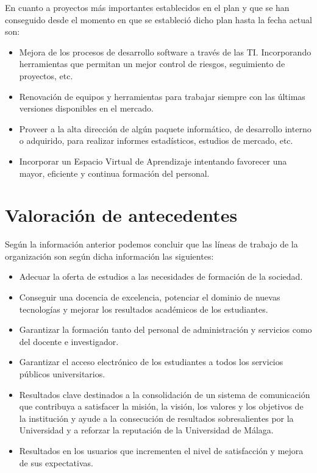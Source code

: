 \documentclass[12pt,a4paper,spanish,twoside]{book}
\begin{document}
\begin{enumerate}
\begin{itemize}
 En cuanto a proyectos más importantes establecidos en el plan y que se han
 conseguido desde el momento en que se estableció dicho plan hasta la fecha
 actual son: 
 \begin{itemize}
 \item Mejora de los procesos de desarrollo software a través de las
   TI. Incorporando herramientas que permitan un mejor control de riesgos,
   seguimiento de proyectos, etc.  

 \item Renovación de equipos y herramientas para trabajar siempre con las
   últimas versiones disponibles en el mercado.

 \item Proveer a la alta dirección de algún paquete informático, de desarrollo
 interno o adquirido, para realizar informes estadísticos, estudios de
 mercado, etc. 

 \item Incorporar un Espacio Virtual de Aprendizaje intentando favorecer
   una mayor, eficiente y continua formación del personal.  
 \end{itemize}

        
\section{Valoración de antecedentes}
Según la información anterior podemos concluir que las líneas de trabajo de
la organización son según dicha información las siguientes: 
\begin{itemize}
\item Adecuar la oferta de estudios a las necesidades de formación de la
sociedad.
\item Conseguir una docencia de excelencia, potenciar el dominio de nuevas
tecnologías y mejorar los resultados académicos de los estudiantes.
\item Garantizar la formación tanto del personal de administración y servicios
como del docente e investigador.
\item Garantizar el acceso electrónico de los estudiantes a todos los servicios
públicos universitarios.
\item Resultados clave destinados a la consolidación de un sistema de
comunicación que contribuya a satisfacer la misión, la visión, los valores
y los objetivos de la institución y ayude a la consecución de resultados
sobresalientes por la Universidad y a reforzar la reputación de la
Universidad de Málaga.
\item Resultados en los usuarios que incrementen el nivel de satisfacción y
mejora de sus expectativas.
\end{itemize}
        

\end{itemize}
\end{enumerate}
\end{document}
